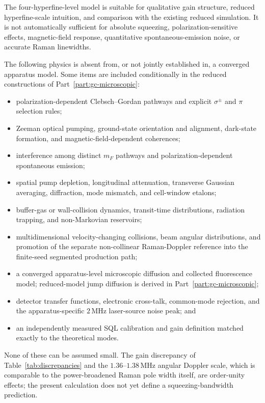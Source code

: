 \documentclass[11pt,a4paper]{article}
\newcommand{\MHz}{\,\mathrm{MHz}}
\begin{document}
The four-hyperfine-level model is suitable for qualitative gain structure,
reduced hyperfine-scale intuition, and comparison with the existing reduced
simulation. It is not automatically sufficient for absolute squeezing,
polarization-sensitive effects, magnetic-field response, quantitative
spontaneous-emission noise, or accurate Raman linewidths.

The following physics is absent from, or not jointly established in, a converged apparatus model. Some items are included conditionally in the reduced constructions of Part~\ref{part:gc-microscopic}:
\begin{itemize}
\item polarization-dependent Clebsch--Gordan pathways and explicit
$\sigma^\pm$ and $\pi$ selection rules;
\item Zeeman optical pumping, ground-state orientation and alignment,
dark-state formation, and magnetic-field-dependent coherences;
\item interference among distinct $m_F$ pathways and
polarization-dependent spontaneous emission;
\item spatial pump depletion, longitudinal attenuation, transverse
Gaussian averaging, diffraction, mode mismatch, and cell-window etalons;
\item buffer-gas or wall-collision dynamics, transit-time distributions,
radiation trapping, and non-Markovian reservoirs;
\item multidimensional velocity-changing collisions, beam angular
distributions, and promotion of the separate non-collinear Raman-Doppler
reference into the finite-seed segmented production path;
\item a converged apparatus-level microscopic diffusion and collected fluorescence model; reduced-model jump diffusion is derived in Part~\ref{part:gc-microscopic};
\item detector transfer functions, electronic cross-talk, common-mode
rejection, and the apparatus-specific $2\MHz$ laser-source noise peak; and
\item an independently measured SQL calibration and gain definition
matched exactly to the theoretical modes.
\end{itemize}

None of these can be assumed small. The gain discrepancy of
Table~\ref{tab:discrepancies} and the $1.36$--$1.38\MHz$ angular Doppler
scale, which is comparable to the power-broadened Raman pole width itself,
are order-unity effects; the present calculation does not yet define a
squeezing-bandwidth prediction.
\end{document}
